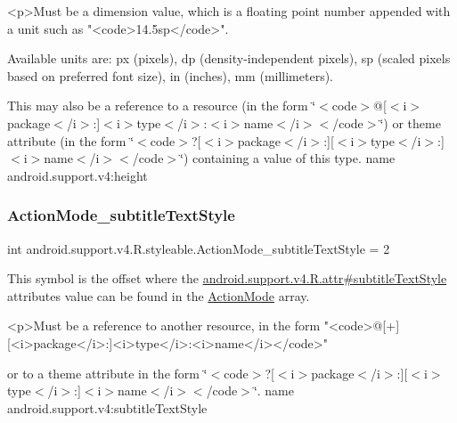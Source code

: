 \begin{DoxyVerb}      <p>Must be a dimension value, which is a floating point number appended with a unit such as "<code>14.5sp</code>".
\end{DoxyVerb}
 Available units are\+: px (pixels), dp (density-\/independent pixels), sp (scaled pixels based on preferred font size), in (inches), mm (millimeters). 

This may also be a reference to a resource (in the form \char`\"{}$<$code$>$@\mbox{[}$<$i$>$package$<$/i$>$\+:\mbox{]}$<$i$>$type$<$/i$>$\+:$<$i$>$name$<$/i$>$$<$/code$>$\char`\"{}) or theme attribute (in the form \char`\"{}$<$code$>$?\mbox{[}$<$i$>$package$<$/i$>$\+:\mbox{]}\mbox{[}$<$i$>$type$<$/i$>$\+:\mbox{]}$<$i$>$name$<$/i$>$$<$/code$>$\char`\"{}) containing a value of this type.  name android.\+support.\+v4\+:height \mbox{\label{classandroid_1_1support_1_1v4_1_1R_1_1styleable_adf85b77127f085c08ae9f7876b127ae8}} 
\subsubsection{\texorpdfstring{Action\+Mode\+\_\+subtitle\+Text\+Style}{ActionMode\_subtitleTextStyle}}
{\footnotesize\ttfamily int android.\+support.\+v4.\+R.\+styleable.\+Action\+Mode\+\_\+subtitle\+Text\+Style = 2\hspace{0.3cm}{\ttfamily [static]}}

This symbol is the offset where the \hyperlink{classandroid_1_1support_1_1v4_1_1R_1_1attr_a13ed407cca47c2a56528aa612128ea4c}{android.\+support.\+v4.\+R.\+attr\#subtitle\+Text\+Style} attribute\textquotesingle{}s value can be found in the \hyperlink{classandroid_1_1support_1_1v4_1_1R_1_1styleable_abc7d063172fa73270c0ab8e5f7093972}{Action\+Mode} array.

\begin{DoxyVerb}      <p>Must be a reference to another resource, in the form "<code>@[+][<i>package</i>:]<i>type</i>:<i>name</i></code>"
\end{DoxyVerb}
 or to a theme attribute in the form \char`\"{}$<$code$>$?\mbox{[}$<$i$>$package$<$/i$>$\+:\mbox{]}\mbox{[}$<$i$>$type$<$/i$>$\+:\mbox{]}$<$i$>$name$<$/i$>$$<$/code$>$\char`\"{}.  name android.\+support.\+v4\+:subtitle\+Text\+Style \mbox{\label{classandroid_1_1support_1_1v4_1_1R_1_1styleable_a76cacf108986d54131f84ffbda5ddc84}} 
